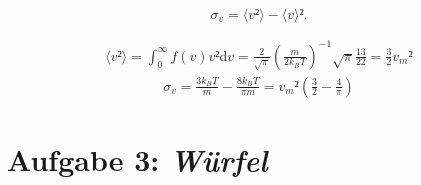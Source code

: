 \begin{itemize}
\begin{equation*}
\sigma_v=\langle v²\rangle-\langle v\rangle².
\end{equation*}

\begin{align*}
\langle v²\rangle=\int_{0}^\infty f(v)v²\text{d}v = \frac{2}{\sqrt{\pi}}\left(\frac{m}{2k_BT}\right)^{-1}\sqrt{\pi}\frac{13}{22} = \frac{3}{2}{v_m}²
\end{align*}
\begin{align*}
\sigma_v = \frac{3k_BT}{m} - \frac{8k_BT}{\pi m}={v_m}²\left(\frac{3}{2}-\frac{4}{\pi}\right)
\end{align*}




\end{itemize}


\section*{Aufgabe 3: \emph{Würfel}}
